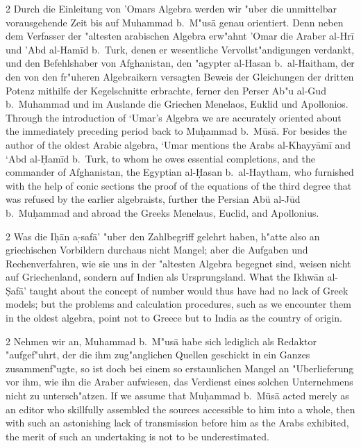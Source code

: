 \documentclass[10pt,a4paper]{article}
\renewcommand{\switchcolumn}{\syncronize\nointerlineskip\columnbreak}
\newcommand{\s}[1]{\d{#1}}
\newcommand{\hw}{\d{h}}
\begin{document}
\begin{paracol}{2}
Durch die Einleitung von 'Omars Algebra werden wir "uber die unmittelbar vorausgehende Zeit bis auf Muhammad b.\ M"us\=a genau orientiert. Denn neben dem Verfasser der "altesten arabischen Algebra erw"ahnt 'Omar die Araber al-Hr\={i} und 'Abd al-Ham\={i}d b.\ Turk, denen er wesentliche Vervollst"andigungen verdankt, und den Befehlshaber von Afghanistan, den "agypter al-Hasan b.\ al-Haitham, der den von den fr"uheren Algebraikern versagten Beweis der Gleichungen der dritten Potenz mithilfe der Kegelschnitte erbrachte, ferner den Perser Ab"u al-Gud b.\ Muhammad und im Auslande die Griechen Menelaos, Euklid und Apollonios.
\switchcolumn
Through the introduction of `Umar's Algebra we are accurately oriented about the immediately preceding period back to Mu\d{h}ammad b.\ M\=us\=a. For besides the author of the oldest Arabic algebra, `Umar mentions the Arabs al-Khayy\=am\={i} and `Abd al-\d{H}am\={i}d b.\ Turk, to whom he owes essential completions, and the commander of Afghanistan, the Egyptian al-\d{H}asan b.\ al-Haytham, who furnished with the help of conic sections the proof of the equations of the third degree that was refused by the earlier algebraists, further the Persian Ab\"u al-J\=ud b.\ Mu\d{h}ammad and abroad the Greeks Menelaus, Euclid, and Apollonius.
\end{paracol}

\begin{paracol}{2}
Was die I\hw{}\=an a\s-s{}af\=a' "uber den Zahlbegriff gelehrt haben, h"atte also an griechischen Vorbildern durchaus nicht Mangel; aber die Aufgaben und Rechenverfahren, wie sie uns in der "altesten Algebra begegnet sind, weisen nicht auf Griechenland, sondern auf Indien als Ursprungsland.
\switchcolumn
What the Ikhw\=an al-\d{S}af\=a' taught about the concept of number would thus have had no lack of Greek models; but the problems and calculation procedures, such as we encounter them in the oldest algebra, point not to Greece but to India as the country of origin.
\end{paracol}

\begin{paracol}{2}
Nehmen wir an, Muhammad b.\ M"us\=a habe sich lediglich als Redaktor "aufgef"uhrt, der die ihm zug"anglichen Quellen geschickt in ein Ganzes zusammenf"ugte, so ist doch bei einem so erstaunlichen Mangel an "Uberlieferung vor ihm, wie ihn die Araber aufwiesen, das Verdienst eines solchen Unternehmens nicht zu untersch"atzen.
\switchcolumn
If we assume that Mu\d{h}ammad b.\ M\=us\=a acted merely as an editor who skillfully assembled the sources accessible to him into a whole, then with such an astonishing lack of transmission before him as the Arabs exhibited, the merit of such an undertaking is not to be underestimated.
\end{paracol}
\end{document}
